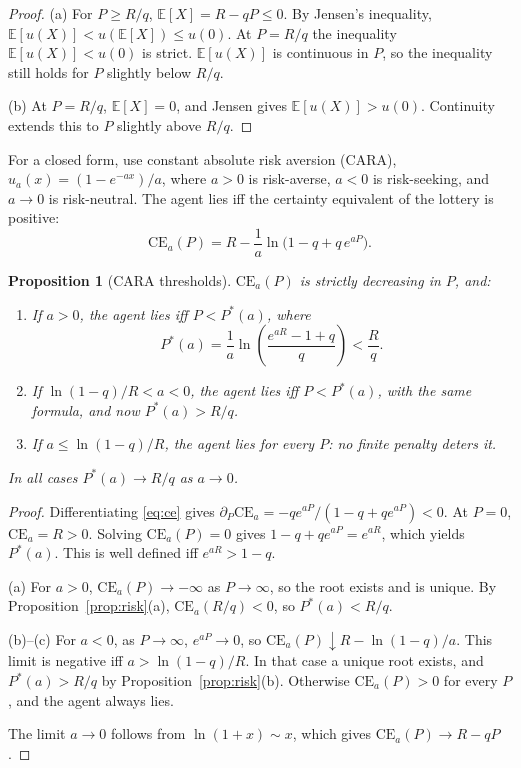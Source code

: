 \documentclass[11pt]{article}
\newtheorem{proposition}[theorem]{Proposition}
\theoremstyle{definition}
\theoremstyle{remark}
\newcommand{\E}{\mathbb{E}}
\newcommand{\1}{\mathbf{1}}
\begin{document}
\begin{proof}
(a) For $P\ge R/q$, $\E[X]=R-qP\le 0$. By Jensen's inequality,
$\E[u(X)]<u(\E[X])\le u(0)$. At $P=R/q$ the inequality $\E[u(X)]<u(0)$ is strict.
$\E[u(X)]$ is continuous in $P$, so the inequality still holds for $P$ slightly below
$R/q$.

(b) At $P=R/q$, $\E[X]=0$, and Jensen gives $\E[u(X)]>u(0)$. Continuity extends this to
$P$ slightly above $R/q$.
\end{proof}

For a closed form, use constant absolute risk aversion (CARA),
$u_a(x)=(1-e^{-ax})/a$, where $a>0$ is risk-averse, $a<0$ is risk-seeking, and $a\to 0$
is risk-neutral. The agent lies iff the certainty equivalent of the lottery is positive:
\begin{equation}\label{eq:ce}
  \mathrm{CE}_a(P) = R-\frac1a\ln\!\big(1-q+q\,e^{aP}\big).
\end{equation}

\begin{proposition}[CARA thresholds]\label{prop:cara}
$\mathrm{CE}_a(P)$ is strictly decreasing in $P$, and:
\begin{enumerate}[label=(\alph*)]
    \item If $a>0$, the agent lies iff $P<P^\ast(a)$, where
    \[
      P^\ast(a)=\frac1a\ln\!\left(\frac{e^{aR}-1+q}{q}\right)<\frac Rq .
    \]
    \item If $\ln(1-q)/R<a<0$, the agent lies iff $P<P^\ast(a)$, with the same formula,
    and now $P^\ast(a)>R/q$.
    \item If $a\le \ln(1-q)/R$, the agent lies for \emph{every} $P$: no finite penalty
    deters it.
\end{enumerate}
In all cases $P^\ast(a)\to R/q$ as $a\to0$.
\end{proposition}

\begin{proof}
Differentiating \eqref{eq:ce} gives
$\partial_P\mathrm{CE}_a=-q e^{aP}/(1-q+qe^{aP})<0$. At $P=0$, $\mathrm{CE}_a=R>0$.
Solving $\mathrm{CE}_a(P)=0$ gives $1-q+qe^{aP}=e^{aR}$, which yields $P^\ast(a)$. This is
well defined iff $e^{aR}>1-q$.

(a) For $a>0$, $\mathrm{CE}_a(P)\to-\infty$ as $P\to\infty$, so the root exists and is
unique. By Proposition~\ref{prop:risk}(a), $\mathrm{CE}_a(R/q)<0$, so $P^\ast(a)<R/q$.

(b)--(c) For $a<0$, as $P\to\infty$, $e^{aP}\to0$, so
$\mathrm{CE}_a(P)\downarrow R-\ln(1-q)/a$. This limit is negative iff $a>\ln(1-q)/R$.
In that case a unique root exists, and $P^\ast(a)>R/q$ by
Proposition~\ref{prop:risk}(b). Otherwise $\mathrm{CE}_a(P)>0$ for every $P$, and the
agent always lies.

The limit $a\to 0$ follows from $\ln(1+x)\sim x$, which gives
$\mathrm{CE}_a(P)\to R-qP$.
\end{proof}
\end{document}
